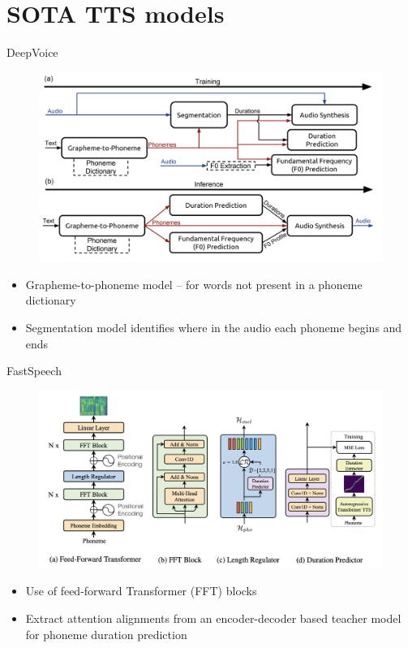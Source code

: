 \section{SOTA TTS models}
\begin{frame}{DeepVoice}
    \begin{figure}
    	\centering
    	\includegraphics[width=0.9\linewidth]{figs/deepvoice.png}
    \end{figure}
    \begin{itemize}
        \item Grapheme-to-phoneme model -- for words not present in a phoneme dictionary
        \item Segmentation model identifies where in the audio each phoneme begins and ends
    \end{itemize}
\end{frame}
\begin{frame}{FastSpeech}
    \begin{figure}
    	\centering
    	\includegraphics[width=0.93\linewidth]{figs/fastspeech.png}
    \end{figure}
    \begin{itemize}
        \item Use of feed-forward Transformer (FFT) blocks
        \item Extract attention alignments from an encoder-decoder based teacher model for phoneme duration prediction
    \end{itemize}

\end{frame}

